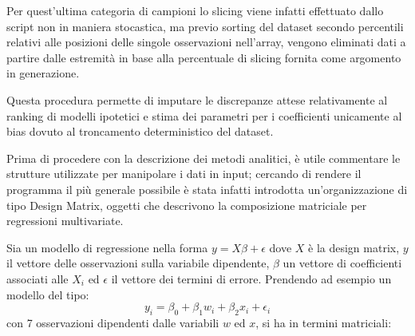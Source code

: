 \documentclass[a4paper]{report}
\begin{document}
Per quest'ultima categoria di campioni lo slicing viene infatti effettuato dallo script non in maniera stocastica, ma previo sorting del dataset secondo percentili relativi alle posizioni delle singole osservazioni nell'array, vengono eliminati dati a partire dalle estremità in base alla percentuale di slicing fornita come argomento in generazione.

Questa procedura permette di imputare le discrepanze attese relativamente al ranking di modelli ipotetici e stima dei parametri per i coefficienti unicamente al bias dovuto al troncamento deterministico del dataset.

Prima di procedere con la descrizione dei metodi analitici, è utile commentare le strutture utilizzate per manipolare i dati in input; cercando di rendere il programma il più generale possibile è stata infatti introdotta un'organizzazione di tipo Design Matrix, oggetti che descrivono la  composizione matriciale per regressioni multivariate.

Sia un modello di regressione nella forma $y=X\beta+\epsilon$ dove $X$ è la design matrix, $y$ il vettore delle osservazioni sulla variabile dipendente, $\beta$ un vettore di coefficienti associati alle $X_i$ ed $\epsilon $ il vettore dei termini di errore.
Prendendo ad esempio un modello del tipo:
\[y_i = \beta_0 + \beta_1 w_i + \beta_2 x_i + \epsilon_i \]
con 7 osservazioni dipendenti dalle variabili $w$ ed $x$, si ha in termini matriciali:
\end{document}
